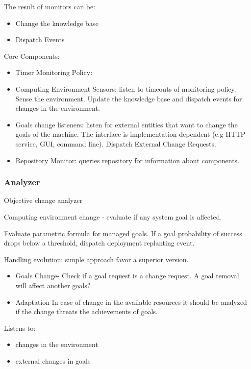 The result of monitors can be:
\begin{itemize}
  \item Change the knowledge base
  \item Dispatch Events
\end{itemize}

Core Components:
\begin{itemize}
  \item Timer Monitoring Policy:
  \item Computing Environment Sensors: listen to timeouts of monitoring policy. Sense the environment. Update the knowledge base and dispatch events for changes in the environment.
  \item Goals change listeners: listen for external entities that want to change the goals of the machine. The interface is implementation dependent (e.g HTTP service, GUI, command line). Dispatch External Change Requests.
  \item Repository Monitor: queries repository for information about components.
\end{itemize}



\subsubsection{Analyzer}

Objective change analyzer

Computing environment change - evaluate if any system goal is affected.

Evaluate parametric formula for managed goals. If a goal probability of success drops below a threshold, dispatch deployment replanting event.

Handling evolution: simple approach favor a superior version.


\begin{itemize}
  \item Goals Change- Check if a goal request is a change request. A goal removal will affect another goals?

  \item Adaptation
In case of change in the available resources
it should be analyzed if the change threats the achievements of goals.

\end{itemize}

Listens to:
\begin{itemize}
  \item changes in the environment
  \item external changes in goals
\end{itemize}

